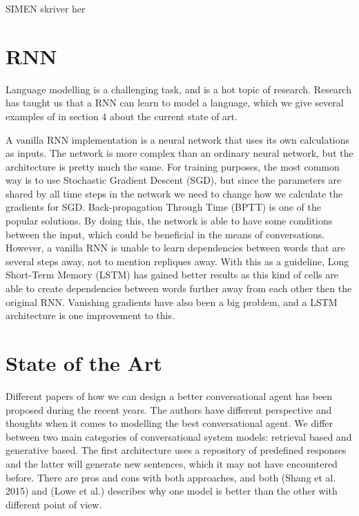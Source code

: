 \documentclass{article} %
\begin{document}
SIMEN skriver her


\section{RNN}
Language modelling is a challenging task, and is a hot topic of research. Research has taught us that a RNN can learn to model a language, which we give several examples of in section 4 about the current state of art. 

A vanilla RNN implementation is a neural network that uses its own calculations as inputs. The network is more complex than an ordinary neural network, but the architecture is pretty much the same. For training purposes, the most common way is to use Stochastic Gradient Descent (SGD), but since the parameters are shared by all time steps in the network we need to change how we calculate the gradients for SGD. Back-propagation Through Time (BPTT) is one of the popular solutions. By doing this, the network is able to have some conditions between the input, which could be beneficial in the means of conversations. However, a vanilla RNN is unable to learn dependencies between words that are several steps away, not to mention repliques away. With this as a guideline, Long Short-Term Memory (LSTM) has gained better results as this kind of cells are able to create dependencies between words further away from each other then the original RNN. Vanishing gradients have also been a big problem, and a LSTM architecture is one improvement to this.

\section{State of the Art}
Different papers of how we can design a better conversational agent has been proposed during the recent years. The authors have different perspective and thoughts when it comes to modelling the best conversational agent. We differ between two main categories of conversational system models: retrieval based and generative based. The first architecture uses a repository of predefined responses and the latter will generate new sentences, which it may not have encountered before. There are pros and cons with both approaches, and both (Shang et al. 2015) and (Lowe et al.) describes why one model is better than the other with different point of view. 
\end{document}

